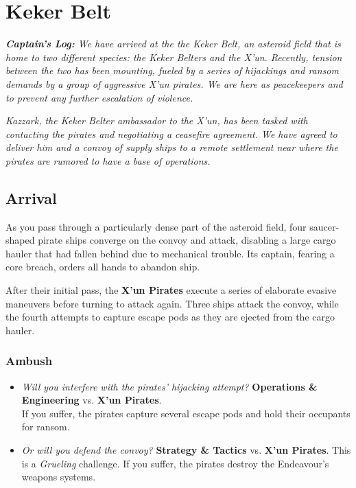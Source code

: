 \documentclass[11pt, a5paper, parskip=half-, DIV=12]{scrartcl}
\begin{document}
\section*{Keker Belt}
\textit{\textbf{Captain's Log:} We have arrived at the the Keker Belt, an asteroid field that is home to two different species: the Keker Belters and the X'un. Recently, tension between the two has been mounting, fueled by a series of hijackings and ransom demands by a group of aggressive X'un pirates. We are here as peacekeepers and to prevent any further escalation of violence.}

\textit{Kazzark, the Keker Belter ambassador to the X'un, has been tasked with contacting the pirates and negotiating a ceasefire agreement. We have agreed to deliver him and a convoy of supply ships to a remote settlement near where the pirates are rumored to have a base of operations.}

\subsection*{Arrival}


As you pass through a particularly dense part of the asteroid field, four saucer-shaped pirate ships converge on the convoy and attack, disabling a large cargo hauler that had fallen behind due to mechanical trouble.  Its captain, fearing a core breach, orders all hands to abandon ship. 

After their initial pass, the \textbf{X'un Pirates} execute a series of elaborate evasive maneuvers before turning to attack again. Three ships attack the convoy, while the fourth attempts to capture escape pods as they are ejected from the cargo hauler.

\subsubsection*{Ambush}
\begin{itemize}
	\item \textit{Will you interfere with the pirates' hijacking attempt?} \textbf{Operations \& Engineering} vs. \textbf{X'un Pirates}. \\ If you suffer, the pirates capture several escape pods and hold their occupants for ransom.
	\item \textit{Or will you defend the convoy?} \textbf{Strategy \& Tactics} vs. \textbf{X'un Pirates}. This is a \textit{Grueling} challenge. If you suffer, the pirates destroy the Endeavour's weapons systems. 
\end{itemize}
\end{document}
